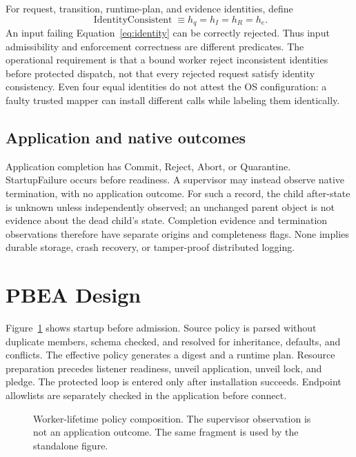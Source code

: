 \documentclass[electronics,article,submit,pdftex,moreauthors]{Definitions/mdpi}
\begin{document}
For request, transition, runtime-plan, and evidence identities, define
\begin{equation}
\operatorname{IdentityConsistent}\equiv h_q=h_I=h_R=h_e.\label{eq:identity}
\end{equation}
An input failing Equation~\eqref{eq:identity} can be correctly rejected. Thus input admissibility and enforcement correctness are different predicates. The operational requirement is that a bound worker reject inconsistent identities before protected dispatch, not that every rejected request satisfy identity consistency. Even four equal identities do not attest the OS configuration: a faulty trusted mapper can install different calls while labeling them identically.

\subsection{Application and native outcomes}
Application completion has Commit, Reject, Abort, or Quarantine. StartupFailure occurs before readiness. A supervisor may instead observe native termination, with no application outcome. For such a record, the child after-state is unknown unless independently observed; an unchanged parent object is not evidence about the dead child's state. Completion evidence and termination observations therefore have separate origins and completeness flags. None implies durable storage, crash recovery, or tamper-proof distributed logging.

\section{PBEA Design}\label{sec:design}
Figure~\ref{fig:architecture} shows startup before admission. Source policy is parsed without duplicate members, schema checked, and resolved for inheritance, defaults, and conflicts. The effective policy generates a digest and a runtime plan. Resource preparation precedes listener readiness, unveil application, unveil lock, and pledge. The protected loop is entered only after installation succeeds. Endpoint allowlists are separately checked in the application before connect.

\begin{figure}[H]\centering

\caption{Worker-lifetime policy composition. The supervisor observation is not an application outcome. The same fragment is used by the standalone figure.}\label{fig:architecture}
\end{figure}
\end{document}
